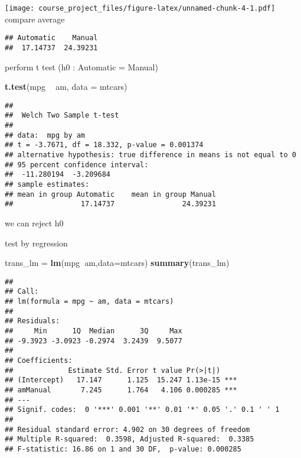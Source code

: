 \documentclass[
]{article}
\newenvironment{Shaded}{\begin{snugshade}}{\end{snugshade}}
\newcommand{\DataTypeTok}[1]{\textcolor[rgb]{0.13,0.29,0.53}{#1}}
\newcommand{\KeywordTok}[1]{\textcolor[rgb]{0.13,0.29,0.53}{\textbf{#1}}}
\newcommand{\NormalTok}[1]{#1}
\newcommand{\OperatorTok}[1]{\textcolor[rgb]{0.81,0.36,0.00}{\textbf{#1}}}
\newcommand{\StringTok}[1]{\textcolor[rgb]{0.31,0.60,0.02}{#1}}
\begin{document}
\texttt{[image: course\_project\_files/figure-latex/unnamed-chunk-4-1.pdf]}
compare average

\begin{Shaded}
\end{Shaded}

\begin{verbatim}
## Automatic    Manual 
##  17.14737  24.39231
\end{verbatim}

perform t test (h0 : Automatic = Manual)

\begin{Shaded}
\begin{Highlighting}[]
\KeywordTok{t.test}\NormalTok{(mpg }\OperatorTok{~}\StringTok{ }\NormalTok{am, }\DataTypeTok{data =}\NormalTok{ mtcars)}
\end{Highlighting}
\end{Shaded}

\begin{verbatim}
## 
##  Welch Two Sample t-test
## 
## data:  mpg by am
## t = -3.7671, df = 18.332, p-value = 0.001374
## alternative hypothesis: true difference in means is not equal to 0
## 95 percent confidence interval:
##  -11.280194  -3.209684
## sample estimates:
## mean in group Automatic    mean in group Manual 
##                17.14737                24.39231
\end{verbatim}

we can reject h0

test by regression

\begin{Shaded}
\begin{Highlighting}[]
\NormalTok{trans_lm =}\StringTok{ }\KeywordTok{lm}\NormalTok{(mpg}\OperatorTok{~}\NormalTok{am,}\DataTypeTok{data=}\NormalTok{mtcars)}
\KeywordTok{summary}\NormalTok{(trans_lm)}
\end{Highlighting}
\end{Shaded}

\begin{verbatim}
## 
## Call:
## lm(formula = mpg ~ am, data = mtcars)
## 
## Residuals:
##     Min      1Q  Median      3Q     Max 
## -9.3923 -3.0923 -0.2974  3.2439  9.5077 
## 
## Coefficients:
##             Estimate Std. Error t value Pr(>|t|)    
## (Intercept)   17.147      1.125  15.247 1.13e-15 ***
## amManual       7.245      1.764   4.106 0.000285 ***
## ---
## Signif. codes:  0 '***' 0.001 '**' 0.01 '*' 0.05 '.' 0.1 ' ' 1
## 
## Residual standard error: 4.902 on 30 degrees of freedom
## Multiple R-squared:  0.3598, Adjusted R-squared:  0.3385 
## F-statistic: 16.86 on 1 and 30 DF,  p-value: 0.000285
\end{verbatim}
\end{document}
